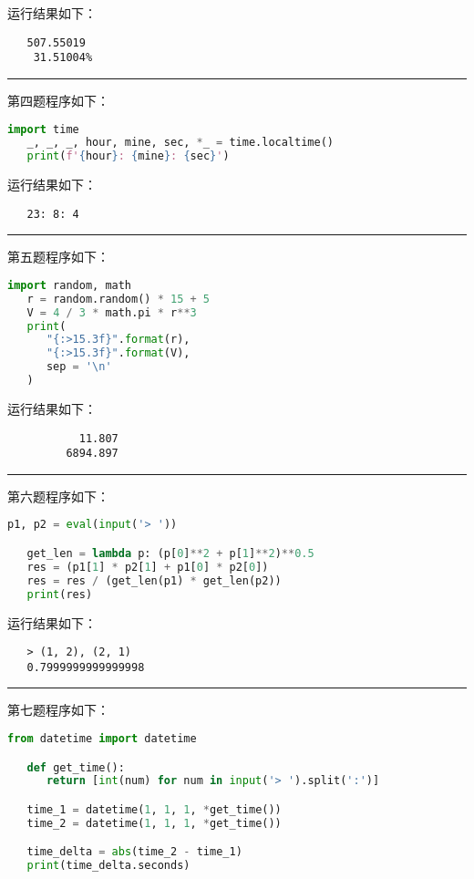 \documentclass[a4paper]{ctexart}
\newcommand{\lineiin}{
   \begin{center}
      \rule{\textwidth}{0.1pt}
   \end{center}
}
\begin{document}
      运行结果如下：
      \begin{lstlisting}
   507.55019
    31.51004%
      \end{lstlisting}

      \lineiin

      第四题程序如下：
      \begin{lstlisting}[language=python]
   import time
   _, _, _, hour, mine, sec, *_ = time.localtime()
   print(f'{hour}: {mine}: {sec}')
      \end{lstlisting}

      运行结果如下：
      \begin{lstlisting}
   23: 8: 4
      \end{lstlisting}

      \lineiin

      第五题程序如下：
      \begin{lstlisting}[language=python]
   import random, math
   r = random.random() * 15 + 5
   V = 4 / 3 * math.pi * r**3
   print(
      "{:>15.3f}".format(r),
      "{:>15.3f}".format(V),
      sep = '\n'
   )
      \end{lstlisting}

      运行结果如下：
      \begin{lstlisting}
           11.807
         6894.897   
      \end{lstlisting}

      \lineiin

      第六题程序如下：
      \begin{lstlisting}[language=python]
   p1, p2 = eval(input('> '))

   get_len = lambda p: (p[0]**2 + p[1]**2)**0.5
   res = (p1[1] * p2[1] + p1[0] * p2[0])
   res = res / (get_len(p1) * get_len(p2))
   print(res)
      \end{lstlisting}

      运行结果如下：
      \begin{lstlisting}
   > (1, 2), (2, 1)
   0.7999999999999998
      \end{lstlisting}

      \lineiin

      第七题程序如下：
      \begin{lstlisting}[language=python]
   from datetime import datetime

   def get_time():
      return [int(num) for num in input('> ').split(':')]

   time_1 = datetime(1, 1, 1, *get_time())
   time_2 = datetime(1, 1, 1, *get_time())

   time_delta = abs(time_2 - time_1)
   print(time_delta.seconds)
      \end{lstlisting}
\end{document}
